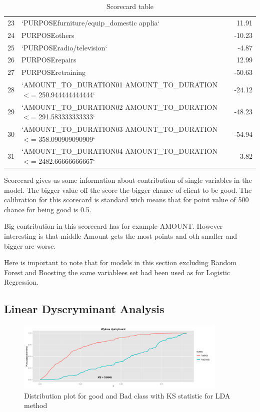 \documentclass[10pt]{article}\usepackage[]{graphicx}\usepackage[]{color}
\begin{document}
\begin{table}[ht]
\begin{tabular}{rlr}
23 & `PURPOSEfurniture/equip\_domestic applia` & 11.91 \\ 
24 & PURPOSEothers & -10.23 \\ 
25 & `PURPOSEradio/television` & -4.87 \\ 
26 & PURPOSErepairs & 12.99 \\ 
27 & PURPOSEretraining & -50.63 \\ 
28 & `AMOUNT\_TO\_DURATION01 AMOUNT\_TO\_DURATION $<$= 250.944444444444` & -24.12 \\ 
29 & `AMOUNT\_TO\_DURATION02 AMOUNT\_TO\_DURATION $<$= 291.583333333333` & -48.23 \\ 
30 & `AMOUNT\_TO\_DURATION03 AMOUNT\_TO\_DURATION $<$= 358.090909090909` & -54.94 \\ 
31 & `AMOUNT\_TO\_DURATION04 AMOUNT\_TO\_DURATION $<$= 2482.66666666667` & 3.82 \\ 
\hline
\end{tabular}
\caption{Scorecard table} 
\end{table} 
 
 
 Scorecard gives us some information about contribution of single variables in the model. The bigger value off the score the bigger chance of client to be good. The calibration for this scorecard is standard wich means that for point value of 500 chance for being good is 0.5.
 
 Big contribution in this scorecard has for example AMOUNT. However interesting is that middle Amount gets the most points and oth smaller and bigger are worse. 
 
Here is important to note that for models in this section excluding Random Forest and Boosting the same variablees set had been used as for Logistic Regression.  
 \clearpage

\subsection{Linear Dyscryminant Analysis}

\begin{figure}[h!]
  \centering
  \includegraphics[width=0.9\textwidth]{Plots/LDA_KS}
  \caption[Close up of \textit{Hemidactylus} sp.]
   {Distribution plot for good and Bad class with KS statistic for LDA method}
\end{figure}
\end{document}
